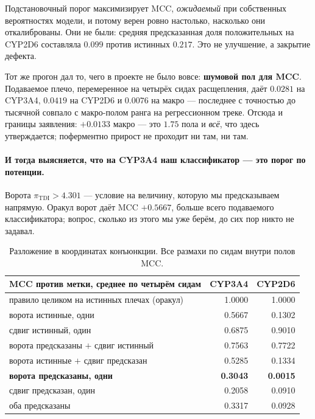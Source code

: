 Подстановочный порог максимизирует MCC, \emph{ожидаемый} при собственных вероятностях модели, и
потому верен ровно настолько, насколько они откалиброваны. Они не были: средняя предсказанная доля
положительных на CYP2D6 составляла $0.099$ против истинных $0.217$. Это не улучшение, а закрытие
дефекта.

Тот же прогон дал то, чего в проекте не было вовсе: \textbf{шумовой пол для MCC}. Подаваемое плечо,
перемеренное на четырёх сидах расщепления, даёт $0.0281$ на CYP3A4, $0.0419$ на CYP2D6 и
$\mathbf{0.0076}$ на макро --- последнее с точностью до тысячной совпало с макро-полом ранга на
регрессионном треке. Отсюда и границы заявления: $+0.0133$ макро --- это $1.75$ пола и
\emph{всё}, что здесь утверждается; поферментно прирост не проходит ни там, ни там.

\paragraph{И тогда выясняется, что на CYP3A4 наш классификатор --- это порог по потенции.} Ворота
$\pi_{\text{TDI}} > 4.301$ --- условие на величину, которую мы предсказываем напрямую. Оракул ворот
даёт MCC $+0.5667$, больше всего подаваемого классификатора; вопрос, сколько из этого мы уже берём,
до сих пор никто не задавал.

\begin{table}[htbp]\centering\small
\begin{tabularx}{0.92\textwidth}{@{}Xrr@{}}
\toprule
MCC против метки, среднее по четырём сидам & CYP3A4 & CYP2D6 \\
\midrule
правило целиком на истинных плечах (оракул)   & 1.0000 & 1.0000 \\
ворота истинные, одни                         & 0.5667 & 0.1302 \\
сдвиг истинный, один                          & 0.6875 & 0.9010 \\
ворота предсказаны $+$ сдвиг истинный         & 0.7563 & 0.7722 \\
ворота истинные $+$ сдвиг предсказан          & 0.5285 & 0.1334 \\
\textbf{ворота предсказаны, одни}             & \textbf{0.3043} & \textbf{0.0015} \\
сдвиг предсказан, один                        & 0.2058 & 0.0910 \\
оба предсказаны                               & 0.3317 & 0.0928 \\
\bottomrule
\end{tabularx}
\caption{Разложение в координатах конъюнкции. Все размахи по сидам внутри полов MCC.}
\label{tab:tdigateoracle}
\end{table}

